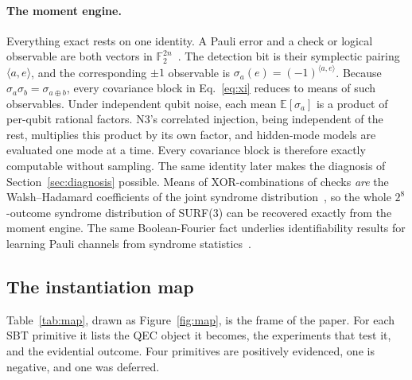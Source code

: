 \paragraph{The moment engine.} Everything exact rests on one identity. A Pauli error and a check or logical observable are both vectors in $\mathbb{F}_2^{2n}$~\cite{gottesman1997stabilizer}. The detection bit is their symplectic pairing $\langle a, e\rangle$, and the corresponding $\pm1$ observable is $\sigma_a(e) = (-1)^{\langle a,e\rangle}$. Because $\sigma_a \sigma_b = \sigma_{a \oplus b}$, every covariance block in Eq.~\eqref{eq:xi} reduces to means of such observables. Under independent qubit noise, each mean $\mathbb{E}[\sigma_a]$ is a product of per-qubit rational factors. N3's correlated injection, being independent of the rest, multiplies this product by its own factor, and hidden-mode models are evaluated one mode at a time. Every covariance block is therefore exactly computable without sampling. The same identity later makes the diagnosis of Section~\ref{sec:diagnosis} possible. Means of XOR-combinations of checks \emph{are} the Walsh--Hadamard coefficients of the joint syndrome distribution~\cite{odonnell2014analysis}, so the whole $2^{8}$-outcome syndrome distribution of SURF(3) can be recovered exactly from the moment engine. %
The same Boolean-Fourier fact underlies identifiability results for learning Pauli channels from syndrome statistics~\cite{wagner2022paulichannels}.

\subsection{The instantiation map}
\label{sec:map}

Table~\ref{tab:map}, drawn as Figure~\ref{fig:map}, is the frame of the paper. For each SBT primitive it lists the QEC object it becomes, the experiments that test it, and the evidential outcome. Four primitives are positively evidenced, one is negative, and one was deferred. %

